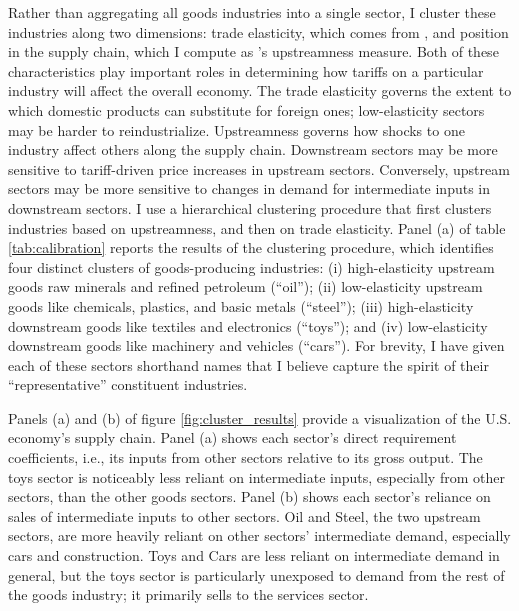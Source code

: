 \documentclass[12pt]{article}
\begin{document}
Rather than aggregating all goods industries into a single sector, I cluster these industries along two dimensions: trade elasticity, which comes from \citet{cp_2015}, and position in the supply chain, which I compute as \citet{acfh_2012}'s upstreamness measure. Both of these characteristics play important roles in determining how tariffs on a particular industry will affect the overall economy. The trade elasticity governs the extent to which domestic products can substitute for foreign ones; low-elasticity sectors may be harder to reindustrialize. Upstreamness governs how shocks to one industry affect others along the supply chain. Downstream sectors may be more sensitive to tariff-driven price increases in upstream sectors. Conversely, upstream sectors may be more sensitive to changes in demand for intermediate inputs in downstream sectors. I use a hierarchical clustering procedure that first clusters industries based on upstreamness, and then on trade elasticity. Panel (a) of table \ref{tab:calibration} reports the results of the clustering procedure, which identifies four distinct clusters of goods-producing industries: (i) high-elasticity upstream goods raw minerals and refined petroleum (``oil''); (ii) low-elasticity upstream goods like chemicals, plastics, and basic metals (``steel''); (iii) high-elasticity downstream goods like textiles and electronics (``toys''); and (iv) low-elasticity downstream goods like machinery and vehicles (``cars''). For brevity, I have given each of these sectors shorthand names that I believe capture the spirit of their ``representative'' constituent industries. 

Panels (a) and (b) of figure \ref{fig:cluster_results} provide a visualization of the U.S. economy's supply chain. Panel (a) shows each sector's direct requirement coefficients, i.e., its inputs from other sectors relative to its gross output. The toys sector is noticeably less reliant on intermediate inputs, especially from other sectors, than the other goods sectors. Panel (b) shows each sector's reliance on sales of intermediate inputs to other sectors. Oil and Steel, the two upstream sectors, are more heavily reliant on other sectors' intermediate demand, especially cars and construction. Toys and Cars are less reliant on intermediate demand in general, but the toys sector is particularly unexposed to demand from the rest of the goods industry; it primarily sells to the services sector.
\end{document}
